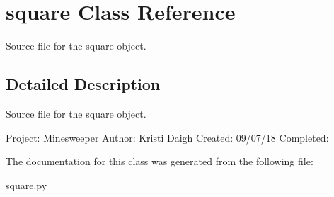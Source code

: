 \hypertarget{classsquare}{}\section{square Class Reference}
\label{classsquare}


Source file for the square object.  




\subsection{Detailed Description}
Source file for the square object. 

Project\+: Minesweeper Author\+: Kristi Daigh Created\+: 09/07/18 Completed\+: 

The documentation for this class was generated from the following file\+:\begin{DoxyCompactItemize}
\item 
square.\+py\end{DoxyCompactItemize}
